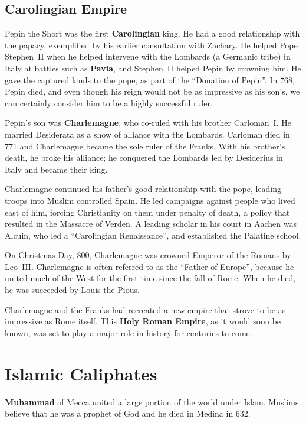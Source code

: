 \subsection*{Carolingian Empire}

Pepin the Short was the first \textbf{Carolingian} king.
He had a good relationship with the papacy, exemplified by his earlier consultation with Zachary.
He helped Pope Stephen~II when he helped intervene with the Lombards (a Germanic tribe)
in Italy at battles such as \textbf{Pavia}, and Stephen~II helped Pepin by crowning him.
He gave the captured lands to the pope, as part of the ``Donation of Pepin''.
In 768, Pepin died, and even though his reign would not be as impressive as his son's,
we can certainly consider him to be a highly successful ruler.

Pepin's son was \textbf{Charlemagne}, who co-ruled with his brother Carloman~I.
He married Desiderata as a show of alliance with the Lombards.
Carloman died in 771 and Charlemagne became the sole ruler of the Franks.
With his brother's death, he broke his alliance;
he conquered the Lombards led by Desiderius in Italy and became their king.

Charlemagne continued his father's good relationship with the pope, leading troops into Muslim controlled Spain.
He led campaigns against people who lived east of him, forcing Christianity on them under penalty of death,
a policy that resulted in the Massacre of Verden.
A leading scholar in his court in Aachen was Alcuin,
who led a ``Carolingian Renaissance'', and established the Palatine school.

On Christmas Day, 800, Charlemagne was crowned Emperor of the Romans by Leo~III\@.
Charlemagne is often referred to as the ``Father of Europe'',
because he united much of the West for the first time since the fall of Rome.
When he died, he was succeeded by Louis the Pious.

Charlemagne and the Franks had recreated a new empire that strove to be as impressive as Rome itself.
This \textbf{Holy Roman Empire}, as it would soon be known,
was set to play a major role in history for centuries to come.

\section{Islamic Caliphates}

\textbf{Muhammad} of Mecca united a large portion of the world under Islam.
Muslims believe that he was a prophet of God and he died in Medina in 632.

